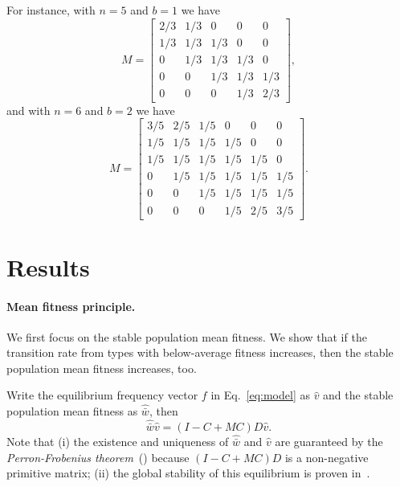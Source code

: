 \documentclass[9pt, a4paper, twocolumn]{extarticle}
\begin{document}
For instance, with $n=5$ and $b=1$ we have
\begin{equation}
M = \begin{bmatrix}
2/3 & 1/3 & 0 & 0 & 0 \\
1/3 & 1/3 & 1/3 & 0 & 0 \\
0 & 1/3 & 1/3 & 1/3 & 0 \\
0 & 0 & 1/3 & 1/3 & 1/3 \\
0 & 0 & 0 & 1/3 & 2/3
\end{bmatrix},
\end{equation}
and with $n=6$ and $b=2$ we have
\begin{equation}
M = \begin{bmatrix}
3/5 & 2/5 & 1/5 & 0 & 0 & 0 \\
1/5 & 1/5 & 1/5 & 1/5 & 0 & 0 \\
1/5 & 1/5 & 1/5 & 1/5 & 1/5 & 0 \\
0 & 1/5 & 1/5 & 1/5 & 1/5 & 1/5 \\
0 & 0 & 1/5 & 1/5 & 1/5 & 1/5 \\
0 & 0 & 0 & 1/5 & 2/5 & 3/5
\end{bmatrix}.
\end{equation}

\section*{Results}

\paragraph*{Mean fitness principle.}

We first focus on the stable population mean fitness.
We  show that if the transition rate from types with below-average fitness increases, then the stable population mean fitness increases, too.

Write the equilibrium  frequency vector $f$ in Eq.~\ref{eq:model} as $\hat v$ and the stable population mean fitness as $\hat{\bar w}$, then
\begin{equation}\label{eq:model_equilibrium}
\hat{\bar w} \hat v = (I-C+MC)D \hat v.
\end{equation}
Note that (i) the existence and uniqueness of $\hat{\bar w}$ and $\hat v$ are guaranteed by the \emph{Perron-Frobenius theorem}~(\cite{Otto2007}) because $(I-C+MC)D$ is a non-negative primitive matrix; 
(ii) the global stability of this equilibrium is proven in~.
\end{document}
